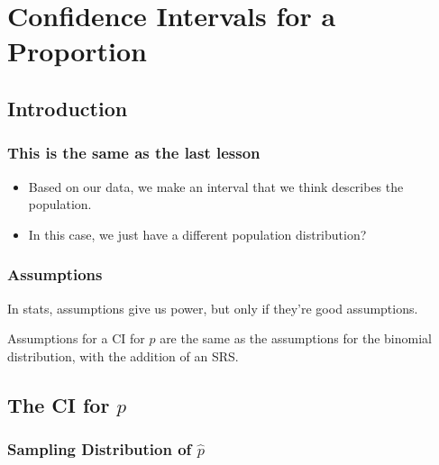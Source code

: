 \documentclass[
  letterpaper,
  DIV=11,
  numbers=noendperiod,
  oneside]{scrreprt}
\providecommand{\tightlist}{%
  \setlength{\itemsep}{0pt}\setlength{\parskip}{0pt}}\usepackage{longtable,booktabs,array}
\begin{document}
\hypertarget{confidence-intervals-for-a-proportion}{%
\chapter{Confidence Intervals for a
Proportion}\label{confidence-intervals-for-a-proportion}}

\hypertarget{introduction-6}{%
\section{Introduction}\label{introduction-6}}

\hypertarget{this-is-the-same-as-the-last-lesson}{%
\subsection{This is the same as the last
lesson}\label{this-is-the-same-as-the-last-lesson}}

\begin{itemize}
\tightlist
\item
  Based on our data, we make an interval that we think describes the
  population.\lspace\pause
\item
  In this case, we just have a different population distribution?
\end{itemize}

\hypertarget{assumptions}{%
\subsection{Assumptions}\label{assumptions}}

In stats, assumptions give us power, \pause but only if they're good
assumptions.

\pause

Assumptions for a CI for \(p\) are the same as the assumptions for the
binomial distribution, with the addition of an SRS.

\hypertarget{the-ci-for-p}{%
\section{\texorpdfstring{The CI for
\(p\)}{The CI for p}}\label{the-ci-for-p}}

\hypertarget{sampling-distribution-of-hat-p}{%
\subsection{\texorpdfstring{Sampling Distribution of
\(\hat p\)}{Sampling Distribution of \textbackslash hat p}}\label{sampling-distribution-of-hat-p}}
\end{document}
